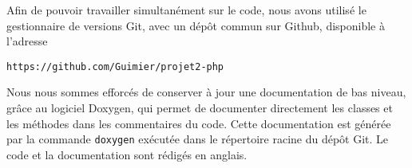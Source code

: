 Afin de pouvoir travailler simultanément sur le code, nous avons utilisé le gestionnaire de versions Git, avec un dépôt commun sur Github, disponible à l’adresse
\begin{verbatim}
https://github.com/Guimier/projet2-php
\end{verbatim}

Nous nous sommes efforcés de conserver à jour une documentation de bas niveau, grâce au logiciel Doxygen, qui permet de documenter directement les classes et les méthodes dans les commentaires du code. Cette documentation est générée par la commande \texttt{doxygen} exécutée dans le répertoire racine du dépôt Git. Le code et la documentation sont rédigés en anglais.
